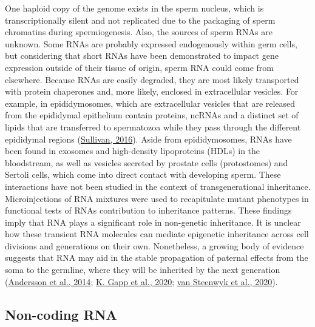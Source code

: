 \documentclass[12pt,twoside]{reedthesis}
\begin{document}
One haploid copy of the genome exists in the sperm nucleus, which is
transcriptionally silent and not replicated due to the packaging of
sperm chromatins during spermiogenesis. Also, the sources of sperm RNAs
are unknown. Some RNAs are probably expressed endogenously within germ
cells, but considering that short RNAs have been demonstrated to impact
gene expression outside of their tissue of origin, sperm RNA could come
from elsewhere. Because RNAs are easily degraded, they are most likely
transported with protein chaperones and, more likely, enclosed in
extracellular vesicles. For example, in epididymosomes, which are
extracellular vesicles that are released from the epididymal epithelium
contain proteins, ncRNAs and a distinct set of lipids that are
transferred to spermatozoa while they pass through the different
epididymal regions (\protect\hyperlink{ref-sullivan2016}{Sullivan, 2016}). Aside from epididymosomes, RNAs have
been found in exosomes and high-density lipoproteins (HDLs) in the
bloodstream, as well as vesicles secreted by prostate cells
(protostomes) and Sertoli cells, which come into direct contact with
developing sperm. These interactions have not been studied in the
context of transgenerational inheritance. Microinjections of RNA
mixtures were used to recapitulate mutant phenotypes in functional tests
of RNAs contribution to inheritance patterns. These findings imply that
RNA plays a significant role in non-genetic inheritance. It is unclear
how these transient RNA molecules can mediate epigenetic inheritance
across cell divisions and generations on their own. Nonetheless, a
growing body of evidence suggests that RNA may aid in the stable
propagation of paternal effects from the soma to the germline, where
they will be inherited by the next generation (\protect\hyperlink{ref-andersson2014}{Andersson et al., 2014}; \protect\hyperlink{ref-gapp2020}{K. Gapp et al., 2020}; \protect\hyperlink{ref-vansteenwyk2020}{van Steenwyk et al., 2020}).

\hypertarget{non-coding-rna}{%
\subsection*{Non-coding RNA}\label{non-coding-rna}}
\end{document}
